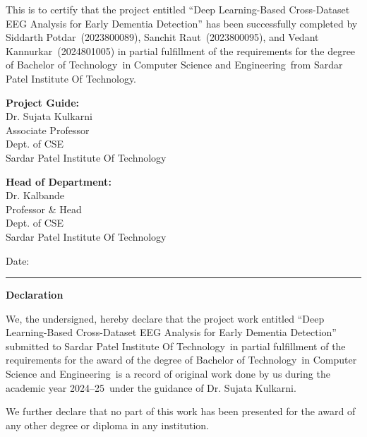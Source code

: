 \documentclass[11pt,a4paper]{article}
\newcommand{\ProjTitleInline}{Deep Learning-Based Cross-Dataset EEG Analysis
for Early Dementia Detection}
\newcommand{\StudentA}{Siddarth Potdar}
\newcommand{\StudentARoll}{2023800089}
\newcommand{\StudentB}{Sanchit Raut}
\newcommand{\StudentBRoll}{2023800095}
\newcommand{\StudentC}{Vedant Kannurkar}
\newcommand{\StudentCRoll}{2024801005}
\newcommand{\GuideName}{Dr. Sujata Kulkarni}
\newcommand{\GuideRank}{Associate Professor}
\newcommand{\HodName}{Dr. Kalbande}
\newcommand{\HodRank}{Professor \& Head}
\newcommand{\DeptShort}{Dept. of CSE}
\newcommand{\CollegeName}{Sardar Patel Institute Of Technology}
\newcommand{\Degree}{Bachelor of Technology}
\newcommand{\Branch}{Computer Science and Engineering}
\newcommand{\AcadYear}{2024--25}
\begin{document}
\begin{sloppypar}
This is to certify that the project entitled ``\ProjTitleInline'' has been
successfully completed by \StudentA\ (\StudentARoll), \StudentB\
(\StudentBRoll), and \StudentC\ (\StudentCRoll) in partial fulfillment of the
requirements for the degree of \Degree\ in \Branch\ from \CollegeName.
\end{sloppypar}

\vspace{22mm}
\noindent
\begin{minipage}[t]{0.48\linewidth}
\raggedright
\textbf{Project Guide:}\\[16mm]
\GuideName\\
\GuideRank\\
\DeptShort\\[2mm]
\CollegeName
\end{minipage}\hfill
\begin{minipage}[t]{0.48\linewidth}
\raggedright
\textbf{Head of Department:}\\[16mm]
\HodName\\
\HodRank\\
\DeptShort\\[2mm]
\CollegeName
\end{minipage}

\vspace{24mm}
\noindent Date: \rule{45mm}{0.4pt}

\clearpage\thispagestyle{empty}
\begin{center}{\Large\bfseries Declaration\par}\end{center}
\vspace{10mm}

We, the undersigned, hereby declare that the project work entitled
``\ProjTitleInline'' submitted to \CollegeName\ in partial fulfillment of the
requirements for the award of the degree of \Degree\ in \Branch\ is a record of
original work done by us during the academic year \AcadYear\ under the guidance
of \GuideName.

We further declare that no part of this work has been presented for the award of
any other degree or diploma in any institution.
\end{document}
